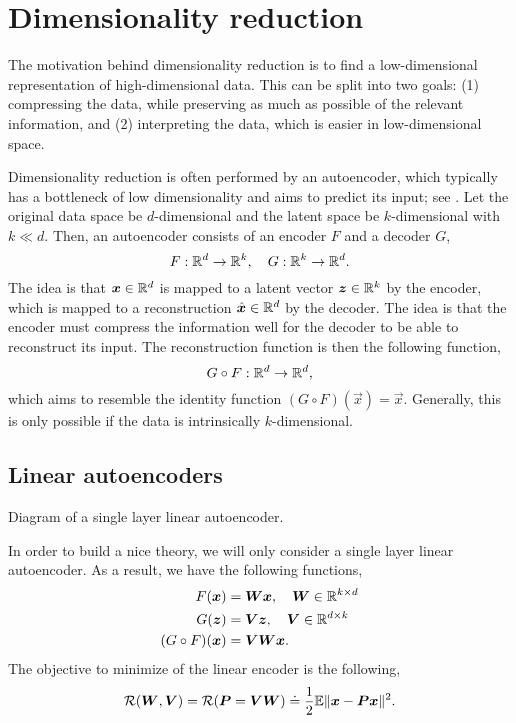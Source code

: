 \section{Dimensionality reduction}

The motivation behind dimensionality reduction is to find a low-dimensional representation of
high-dimensional data. This can be split into two goals: (1) compressing the
data, while preserving as much as possible of the relevant information, and (2) interpreting the
data, which is easier in low-dimensional space.

Dimensionality reduction is often performed by an autoencoder, which typically has a bottleneck of
low dimensionality and aims to predict its input; see . Let the original
data space be $d$-dimensional and the latent space be $k$-dimensional with $k \ll d$. Then, an
autoencoder consists of an encoder $F$ and a decoder $G$, \[
    F: \mathbb{R}^d \to \mathbb{R}^k, \quad G: \mathbb{R}^k \to \mathbb{R}^d.
\]
The idea is that $\bm{x} \in \mathbb{R}^d$ is mapped to a latent vector $\bm{z} \in \mathbb{R}^k$ by the encoder,
which is mapped to a reconstruction $\hat{\bm{x}} \in \mathbb{R}^d$ by the decoder. The idea is that the
encoder must compress the information well for the decoder to be able to reconstruct its input. The
reconstruction function is then the following function, \[
    G \circ F: \mathbb{R}^d \to \mathbb{R}^d,
\]
which aims to resemble the identity function $(G \circ F)(\vec{x}) = \vec{x}$. Generally, this is
only possible if the data is intrinsically $k$-dimensional.

\subsection{Linear autoencoders}

\begin{marginfigure}[-8cm]
    \centering
    \caption{Diagram of a single layer linear autoencoder.}
    \label{fig:auto-encoder}
\end{marginfigure}

In order to build a nice theory, we will only consider a single layer linear
autoencoder. As a result, we have the following functions,
\begin{align*}
    F(\bm{x})           & = \bm{W}\bm{x}, \quad \bm{W} \in \mathbb{R}^{k\times d}  \\
    G(\bm{z})           & = \bm{V} \bm{z}, \quad \bm{V} \in \mathbb{R}^{d\times k} \\
    (G \circ F)(\bm{x}) & = \bm{V} \bm{W} \bm{x}.
\end{align*}
The objective to minimize of the linear encoder is the following, \[
    \mathcal{R}(\bm{W},\bm{V}) = \mathcal{R}(\bm{P} = \bm{V}\bm{W}) \doteq \frac{1}{2} \mathbb{E} \| \bm{x}-\bm{P}\bm{x} \|^2.
\]

